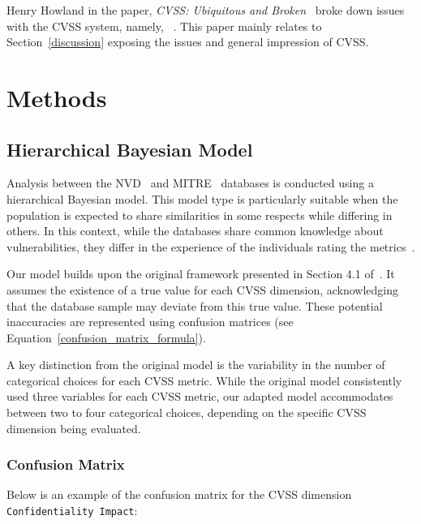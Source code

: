 \documentclass[12pt]{article}
\begin{document}
Henry Howland in the paper, \textit{CVSS: Ubiquitous and Broken}~\cite{ubiquitous} broke down issues with
the CVSS system, namely, ~\cite{ubiquitous}.  This paper mainly relates to Section~\ref{discussion} exposing the
issues and general impression of CVSS.


\section{Methods}

\subsection{Hierarchical Bayesian Model} \label{bayesian_modeling}

Analysis between the NVD~\cite{NVD} and MITRE~\cite{MITRE} databases is conducted using a
hierarchical Bayesian model. This model type is particularly suitable when the population is
expected to share similarities in some respects while differing in others. In this context, while
the databases share common knowledge about vulnerabilities, they differ in the experience of the
individuals rating the metrics~\cite{bayes}.

Our model builds upon the original framework presented in Section 4.1 of~\cite{bayes}. It assumes
the existence of a true value for each CVSS dimension, acknowledging that the database sample may
deviate from this true value. These potential inaccuracies are represented using confusion matrices
(see Equation~\ref{confusion_matrix_formula}).

A key distinction from the original model is the variability in the number of categorical choices
for each CVSS metric. While the original model consistently used three variables for each CVSS
metric, our adapted model accommodates between two to four categorical choices, depending on the
specific CVSS dimension being evaluated.

\subsubsection{Confusion Matrix}

Below is an example of the confusion matrix for the CVSS dimension \texttt{Confidentiality Impact}:
\end{document}
